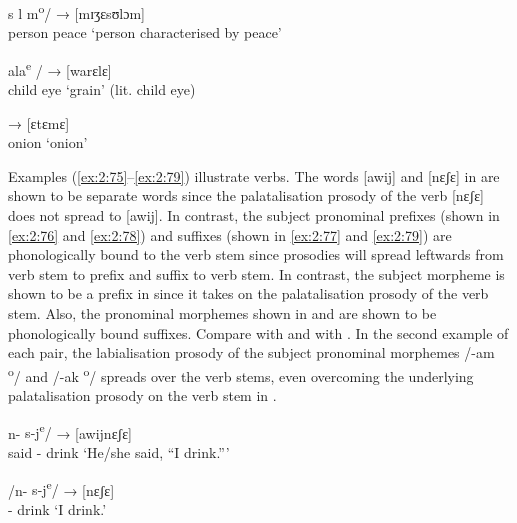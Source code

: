 \ea \label{ex:2:72}

  {s l m\textsuperscript{o}/}   →    [mɪʒɛsʊlɔm]\\
     person                       peace                          {}   {‘person characterised by peace’}\\
\z

\ea \label{ex:2:73}
     {ala\textsuperscript{e }/} \hspace{12pt}  →   [warɛlɛ] \\
    child       eye                    {}      {}  {‘grain’ (lit. child eye)}\\
\z

\ea \label{ex:2:74}
 \hspace{18pt} → [ɛtɛmɛ]\\
     onion                     {}  {} ‘onion’\\
\z

Examples (\ref{ex:2:75}--\ref{ex:2:79}) illustrate verbs. The words [awij] and [nɛʃɛ] in  are shown to be separate words since the palatalisation prosody of the verb [nɛʃɛ] does not spread to [awij]. In contrast, the subject pronominal prefixes (shown in \ref{ex:2:76} and \ref{ex:2:78}) and suffixes (shown in \ref{ex:2:77} and \ref{ex:2:79}) are phonologically bound to the verb stem since prosodies will spread leftwards from verb stem to prefix and suffix to verb stem. In contrast, the subject morpheme is shown to be a prefix in  since it takes on the palatalisation prosody of the verb stem. Also, the pronominal morphemes shown in  and  are shown to be phonologically bound suffixes. Compare  with  and  with . In the second example of each pair, the labialisation prosody of the subject pronominal morphemes /{}-am \textsuperscript{o}/  and /{}-ak \textsuperscript{o}/  spreads over the verb stems, even overcoming the underlying palatalisation prosody on the verb stem in . 

\ea \label{ex:2:75}
                               n-   {s-j\textsuperscript{e}/} \hspace{9pt} →    [awijnɛʃɛ]\\
     {said}  {\oneS}- drink                  {}  {}   {‘He/she said, “I drink.”’}\\
\z

\ea \label{ex:2:76}
\gll /n-      {s-j\textsuperscript{e}/} \hspace{32pt} →  [nɛʃɛ]\\
    {\oneS}-  drink                {}    {}  {‘I drink.’}\\
\z

